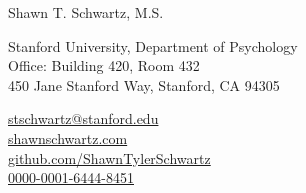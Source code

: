 {\huge Shawn T. Schwartz, M.S.} %
\medskip

Stanford University, Department of Psychology\\
Office: Building 420, Room 432\\
450 Jane Stanford Way, Stanford, CA 94305

\medskip %

 \href{mailto:stschwartz@stanford.edu}{stschwartz@stanford.edu} \\
 \href{https://shawnschwartz.com}{shawnschwartz.com} \\
 \href{https://github.com/ShawnTylerSchwartz}{github.com/ShawnTylerSchwartz} \\
 \href{https://orcid.org/0000-0001-6444-8451}{0000-0001-6444-8451}
